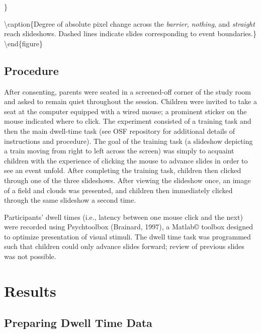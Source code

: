 \documentclass[
  english,
  man,floatsintext]{apa6}
\begin{document}
\}

\textbackslash caption\{Degree of absolute pixel change across the \emph{barrier}, \emph{nothing}, and \emph{straight} reach slideshows. Dashed lines indicate slides corresponding to event boundaries.\}\label{fig:fig3}
\textbackslash end\{figure\}

\hypertarget{procedure}{%
\subsection{Procedure}\label{procedure}}

After consenting, parents were seated in a screened-off corner of the study room and asked to remain quiet throughout the session. Children were invited to take a seat at the computer equipped with a wired mouse; a prominent sticker on the mouse indicated where to click. The experiment consisted of a training task and then the main dwell-time task (see OSF repository for additional details of instructions and procedure). The goal of the training task (a slideshow depicting a train moving from right to left across the screen) was simply to acquaint children with the experience of clicking the mouse to advance slides in order to see an event unfold. After completing the training task, children then clicked through one of the three slideshows. After viewing the slideshow once, an image of a field and clouds was presented, and children then immediately clicked through the same slideshow a second time.

Participants' dwell times (i.e., latency between one mouse click and the next) were recorded using Psychtoolbox (Brainard, 1997), a Matlab© toolbox designed to optimize presentation of visual stimuli. The dwell time task was programmed such that children could only advance slides forward; review of previous slides was not possible.

\hypertarget{results}{%
\section{Results}\label{results}}

\hypertarget{preparing-dwell-time-data}{%
\subsection{Preparing Dwell Time Data}\label{preparing-dwell-time-data}}
\end{document}

